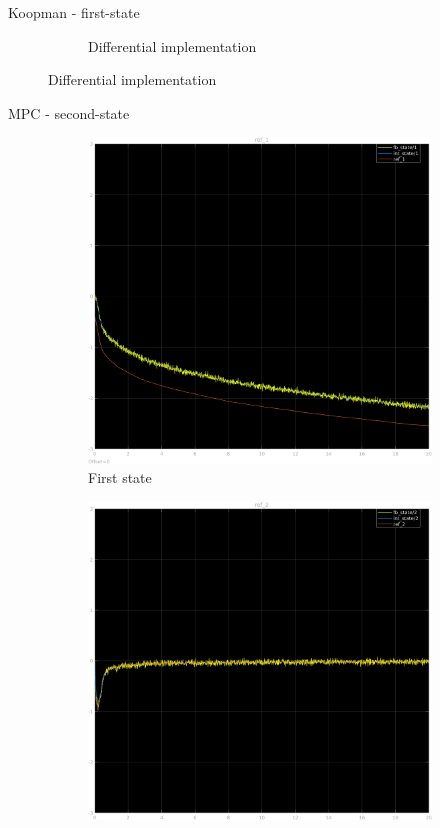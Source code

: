 \documentclass{beamer}
\begin{document}
\begin{frame}{Koopman - first-state}
\begin{figure}
\begin{subfigure}[b]{0.45\textwidth}
            \caption{Differential implementation}
        \end{subfigure}
    \end{figure}
\end{frame}

\begin{frame}{MPC - second-state}
    \begin{figure}
        \centering
        \begin{subfigure}[b]{0.45\textwidth}
            \centering
            \includegraphics[width=\textwidth]{second_mpc_1.png}
            \caption{First state}
        \end{subfigure}
        \hfill
        \begin{subfigure}[b]{0.45\textwidth}
            \centering
            \includegraphics[width=\textwidth]{second_mpc_2.png}

\end{subfigure}
\end{figure}
\end{frame}
\end{document}
